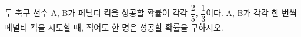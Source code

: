 두 축구 선수 A, B가 페널티 킥을 성공할 확률이 각각 $\dfrac{2}{5}$, $\dfrac{1}{3}$이다. A, B가 각각 한 번씩 페널티 킥을 시도할 때, 적어도 한 명은 성공할 확률을 구하시오.
